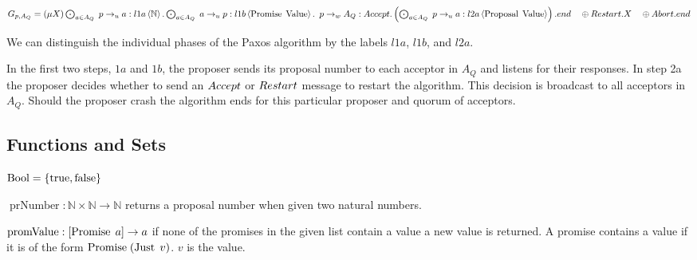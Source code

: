 $G_{p, A_Q} = \left(\mu X\right) \bigodot_{a \in A_Q}\; p \to_u a : l1a \left\langle \mathbb{N} \right\rangle . \bigodot_{a \in A_Q}\; a \to_u p : l1b \left\langle \operatorname{Promise}\; \operatorname{Value} \right\rangle .\\
\hspace*{0.5em}p \to_w A_Q : \mathnormal{Accept}.\left(\bigodot_{a \in A_Q}\; p \to_u a : l2a \left\langle \operatorname{Proposal}\; \operatorname{Value} \right\rangle\right).end\\
\hspace*{1em}\oplus \mathnormal{Restart}.X\\
\hspace*{1em}\oplus \mathnormal{Abort}.end$

We can distinguish the individual phases of the Paxos algorithm by the labels $l1a$, $l1b$, and $l2a$.

In the first two steps, $1a$ and $1b$, the proposer sends its proposal number to each acceptor in $A_Q$ and listens for their responses.
In step 2a the proposer decides whether to send an $\mathnormal{Accept}$ or $\mathnormal{Restart}$ message to restart the algorithm.
This decision is broadcast to all acceptors in $A_Q$.
Should the proposer crash the algorithm ends for this particular proposer and quorum of acceptors.

\subsection{Functions and Sets}
\newcommand{\Bool}[0]{\operatorname{Bool}}
\newcommand{\True}[0]{\operatorname{true}}
\newcommand{\False}[0]{\operatorname{false}}
\newcommand{\prNumber}[2]{\operatorname{prNumber}\left( #1, #2 \right)}
\newcommand{\promValue}[1]{\operatorname{promValue}\left(#1\right)}
\newcommand{\anyNack}[1]{\operatorname{anyNack}\left(#1\right)}
\newcommand{\promCount}[1]{\operatorname{promCount}\left(#1\right)}
\newcommand{\greaterThan}[2]{\operatorname{gt}\left(#1, #2\right)}
\newcommand{\greaterEqual}[2]{\operatorname{ge}\left(#1, #2\right)}
\newcommand{\nFromPr}[1]{\operatorname{nFromPr}\left(#1 \right)}
\newcommand{\genAq}[3]{\operatorname{genA_Q}\left(#1, #2, #3\right)}

$\Bool = \Sort{\True, \False}$

$\operatorname{prNumber} : \mathbb{N} \times \mathbb{N} \to \mathbb{N}$ returns a proposal number when given two natural numbers.

$\operatorname{promValue} : [\operatorname{Promise}\; a] \to a$ if none of the promises in the given list contain a value a new value is returned.
A promise contains a value if it is of the form $\operatorname{Promise}\; (\operatorname{Just}\; v)$.
$v$ is the value.


